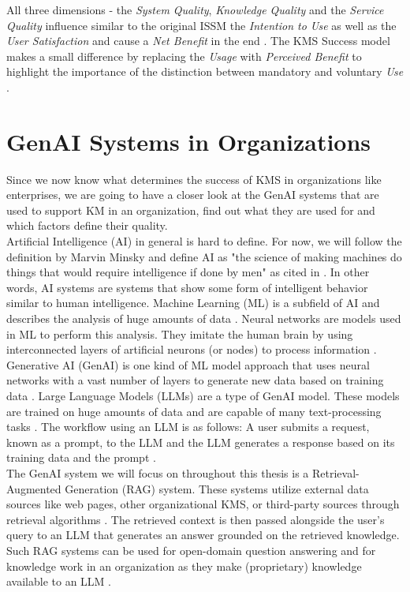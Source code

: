 \documentclass[
	english,
	ruledheaders=section,%
	class=report,%
	thesis={type=bachelor},%
	accentcolor=1b,%
	custommargins=true,%
	marginpar=false,%
	parskip=half-,%
	fontsize=11pt,%
	DIV=14,
]{tudapub}
\begin{document}
All three dimensions - the \textit{System Quality}, \textit{Knowledge Quality} and the \textit{Service Quality} influence similar to the original ISSM the \textit{Intention to Use} as well as the \textit{User Satisfaction} and cause a \textit{Net Benefit} in the end \parencite[p.~56]{Jennex2006}. The KMS Success model makes a small difference by replacing the \textit{Usage} with \textit{Perceived Benefit} to highlight the importance of the distinction between mandatory and voluntary \textit{Use} \parencite[p.~55]{Jennex2006}.
\section{GenAI Systems in Organizations}
Since we now know what determines the success of KMS in organizations like enterprises, we are going to have a closer look at the GenAI systems that are used to support KM in an organization, find out what they are used for and which factors define their quality.\\
Artificial Intelligence (AI) in general is hard to define. For now, we will follow the definition by Marvin Minsky and define AI as "the science of making machines do things that would require intelligence if done by men" \parencite{Minsky1966} as cited in \parencite{Dennis2025}. In other words, AI systems are systems that show some form of intelligent behavior similar to human intelligence. Machine Learning (ML) is a subfield of AI and describes the analysis of huge amounts of data \parencite[p.~573]{Lund2023}. Neural networks are models used in ML to perform this analysis. They imitate the human brain by using interconnected layers of artificial neurons (or nodes) to process information \parencite[p.~573]{Lund2023}. Generative AI (GenAI) is one kind of ML model approach that uses neural networks with a vast number of layers to generate new data based on training data \parencite[p.~574]{Lund2023}.
Large Language Models (LLMs) are a type of GenAI model. These models are trained on huge amounts of data and are capable of many text-processing tasks \parencite[p.~2]{Naveed2024}. The workflow using an LLM is as follows: A user submits a request, known as a prompt, to the LLM and the LLM generates a response based on its training data and the prompt \parencite[p.~575]{Lund2023}.\\
The GenAI system we will focus on throughout this thesis is a Retrieval-Augmented Generation (RAG) system. These systems utilize external data sources like web pages, other organizational KMS, or third-party sources through retrieval algorithms \parencite{AWS_RAG}. The retrieved context is then passed alongside the user's query to an LLM that generates an answer grounded on the retrieved knowledge. Such RAG systems can be used for open-domain question answering and for knowledge work in an organization as they make (proprietary) knowledge available to an LLM \parencite[p.~9459]{Lewis2020}.
\end{document}
